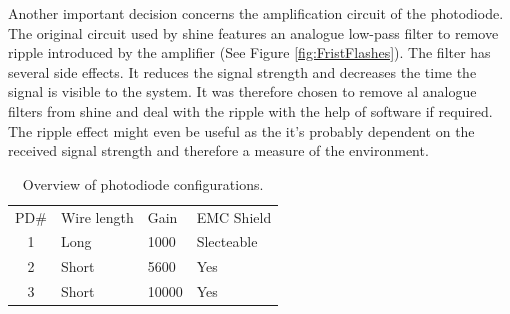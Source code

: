 Another important decision concerns the amplification circuit of the photodiode. The original circuit used by shine features an analogue low-pass filter to remove ripple introduced by the amplifier (See Figure \ref{fig:FristFlashes}). The filter has several side effects. It reduces the signal strength and decreases the time the signal is visible to the system. It was therefore chosen to remove al analogue filters from shine and deal with the ripple with the help of software if required. The ripple effect might even be useful as the it's probably dependent on the received signal strength and therefore a measure of the environment.

\begin{table}[]
	\centering
	\begin{tabular}{clll}
		PD\#                   & Wire length & Gain  & EMC Shield \\ \cline{2-4} 
		\multicolumn{1}{c|}{1} & Long        & 1000  & Slecteable \\
		\multicolumn{1}{c|}{2} & Short       & 5600  & Yes        \\
		\multicolumn{1}{c|}{3} & Short       & 10000 & Yes       
	\end{tabular}
	\caption{Overview of photodiode configurations.\label{tbl:PDs}}
\end{table}

